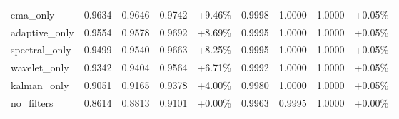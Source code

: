 \begin{table}[htbp]
\begin{adjustbox}{max width=\textwidth}
\begin{tabular}{l cccc cccc}
ema\_only & 0.9634 & 0.9646 & 0.9742 & +9.46\% & 0.9998 & 1.0000 & 1.0000 & +0.05\% \\
adaptive\_only & 0.9554 & 0.9578 & 0.9692 & +8.69\% & 0.9995 & 1.0000 & 1.0000 & +0.05\% \\
spectral\_only & 0.9499 & 0.9540 & 0.9663 & +8.25\% & 0.9995 & 1.0000 & 1.0000 & +0.05\% \\
wavelet\_only & 0.9342 & 0.9404 & 0.9564 & +6.71\% & 0.9992 & 1.0000 & 1.0000 & +0.05\% \\
kalman\_only & 0.9051 & 0.9165 & 0.9378 & +4.00\% & 0.9980 & 1.0000 & 1.0000 & +0.05\% \\
no\_filters & 0.8614 & 0.8813 & 0.9101 & +0.00\% & 0.9963 & 0.9995 & 1.0000 & +0.00\% \\
\bottomrule
\end{tabular}
\end{adjustbox}
\end{table}